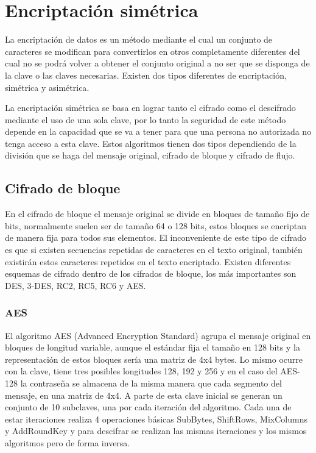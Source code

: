 
\section{Encriptación simétrica} 

La encriptación de datos es un método mediante el cual un conjunto de caracteres se modifican para convertirlos en otros completamente diferentes del cual no se podrá volver a obtener el conjunto original a no ser que se disponga de la clave o las claves necesarias. Existen dos tipos diferentes de encriptación, simétrica y asimétrica\cite{encriptacion}. 

La encriptación simétrica se basa en lograr tanto el cifrado como el descifrado mediante el uso de una sola clave, por lo tanto la seguridad de este método depende en la capacidad que se va a tener para que una persona no autorizada no tenga acceso a esta clave\cite{simetrico}. Estos algoritmos tienen dos tipos dependiendo de la división que se haga del mensaje original, cifrado de bloque y cifrado de flujo\cite{tiposcifrado}.

\subsection{Cifrado de bloque}
En el cifrado de bloque el mensaje original se divide en bloques de tamaño fijo de bits, normalmente suelen ser de tamaño 64 o 128 bits, estos bloques se encriptan de manera fija para todos sus elementos. El inconveniente de este tipo de cifrado es que si existen secuencias repetidas de caracteres en el texto original, también existirán estos caracteres repetidos en el texto encriptado\cite{cifradobloque}. Existen diferentes esquemas de cifrado dentro de los cifrados de bloque, los más importantes son DES, 3-DES, RC2, RC5, RC6 y AES\cite{simetrico}.

\subsubsection{AES}
El algoritmo AES (Advanced Encryption Standard) agrupa el mensaje original en bloques de longitud variable, aunque el estándar fija el tamaño en 128 bits y la representación de estos bloques sería una matriz de 4x4 bytes. Lo mismo ocurre con la clave, tiene tres posibles longitudes 128, 192 y 256 y en el caso del AES-128 la contraseña se almacena de la misma manera que cada segmento del mensaje, en una matriz de 4x4. A parte de esta clave inicial se generan un conjunto de 10 subclaves, una por cada iteración del algoritmo. Cada una de estar iteraciones realiza 4 operaciones básicas SubBytes, ShiftRows, MixColumns y AddRoundKey y para descifrar se realizan las mismas iteraciones y los mismos algoritmos pero de forma inversa\cite{AES}.


